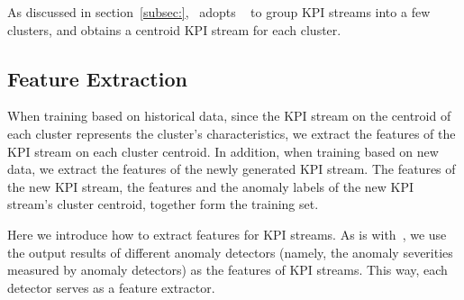 As discussed in section~\ref{subsec:}, \name~adopts \ROCKA~\cite{lirobust} to group KPI streams into a few clusters, and obtains a centroid KPI stream for each cluster. 

\subsection{Feature Extraction}
\label{subsubsec:feature_extraction}

When training based on historical data, since the KPI stream on the centroid of each cluster represents the cluster's characteristics, we extract the features of the KPI stream on each cluster centroid.
In addition, when training based on new data, we extract the features of the newly generated KPI stream.
The features of the new KPI stream, the features and the anomaly labels of 
the new KPI stream's cluster centroid,
together form the training set.

Here we introduce how to extract features for KPI streams.
As is with~\cite{liu2015opprentice}, we use the output results of different anomaly detectors (namely, the anomaly severities measured by anomaly detectors) as the features of KPI streams.
This way, each detector serves as a feature extractor.


